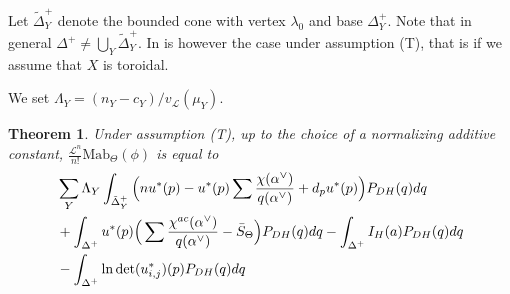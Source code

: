\documentclass{amsart}
\newtheorem{thm}{Theorem}[section]
\theoremstyle{definition}
\begin{document}
Let $\tilde{\Delta}^+_Y$ denote the bounded cone with vertex $\lambda_0$ and base $\Delta^+_Y$. 
Note that in general $\Delta^+\neq \bigcup_Y \tilde{\Delta}^+_Y$.
In is however the case under assumption (T), that is if we assume that $X$ is toroidal. 

We set $\Lambda_Y=(n_Y-c_Y)/v_{\mathcal{L}}(\mu_Y)$. 

\begin{thm} 
\label{thm_mabuchi}
Under assumption (T), up to the choice of a normalizing additive constant, 
$\frac{\mathcal{L}^n}{n!} \mathrm{Mab}_{\Theta}(\phi)$ is equal to 
\begin{align*}
&
\sum_Y \Lambda_Y 
\int_{\tilde{\Delta}^+_Y} \Big{(}nu^*(p)-u^*(p)\sum \frac{\chi(\alpha^{\vee})}{q(\alpha^{\vee})} +d_pu^*(p)\Big{)}P_{DH}(q)dq \\
& 
+\int_{\Delta^+} u^*(p)\Big{(}\sum \frac{\chi^{ac}(\alpha^{\vee})}{q(\alpha^{\vee})}-\bar{S}_{\Theta}\Big{)}P_{DH}(q)dq 
-\int_{\Delta^+}I_H(a)P_{DH}(q)dq \\
&
-\int_{\Delta^+}\ln\det (u^*_{i,j})(p)P_{DH}(q)dq 
\end{align*}
\end{thm}
\end{document}
